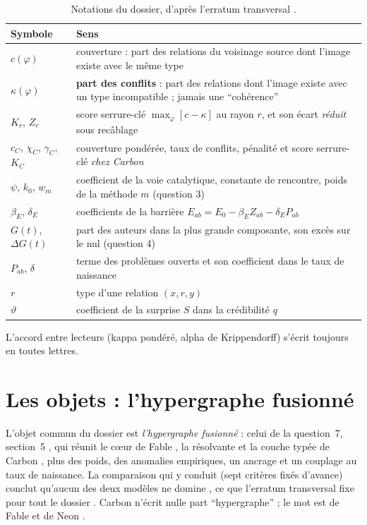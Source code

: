 \documentclass[11pt,a4paper]{article}
\theoremstyle{definition}
\theoremstyle{plain}
\begin{document}
\begin{table}[ht]
\centering\small
\caption{Notations du dossier, d'après l'erratum transversal \cite{erratumkappa}.}
\label{tab:notations}
\begin{tabularx}{\textwidth}{@{}lX@{}}
\toprule
Symbole & Sens \\
\midrule
$c(\varphi)$ & couverture : part des relations du voisinage source dont l'image existe avec le même type \\
$\kappa(\varphi)$ & \textbf{part des conflits} : part des relations dont l'image existe avec un type incompatible ; jamais une \enquote{cohérence} \\
$K_r$, $Z_r$ & score serrure-clé $\max_\varphi[c-\kappa]$ au rayon $r$, et son écart \emph{réduit} sous recâblage \\
$c_C$, $\chi_C$, $\gamma_C$, $K_C$ & couverture pondérée, taux de conflits, pénalité et score serrure-clé \emph{chez Carbon} \\
$\psi$, $k_0$, $w_m$ & coefficient de la voie catalytique, constante de rencontre, poids de la méthode $m$ (question 3) \\
$\beta_E$, $\delta_E$ & coefficients de la barrière $E_{ab}=E_0-\beta_E Z_{ab}-\delta_E P_{ab}$ \\
$G(t)$, $\Delta G(t)$ & part des auteurs dans la plus grande composante, son excès sur le nul (question 4) \\
$P_{ab}$, $\delta$ & terme des problèmes ouverts et son coefficient dans le taux de naissance \\
$r$ & type d'une relation $(x,r,y)$ \\
$\vartheta$ & coefficient de la surprise $S$ dans la crédibilité $q$ \\
\bottomrule
\end{tabularx}
\end{table}
L'accord entre lecteurs (kappa pondéré, alpha de Krippendorff) s'écrit toujours en toutes lettres.

\section{Les objets : l'hypergraphe fusionné}
\label{sec:objets}

L'objet commun du dossier est \emph{l'hypergraphe fusionné} : celui de la question~7, section~5
\cite{q7}, qui réunit le cœur de Fable \cite{fable}, la résolvante et la couche typée de
Carbon \cite{carbonmeta,carbonhomo}, plus des poids, des anomalies empiriques, un ancrage et un
couplage au taux de naissance. La comparaison qui y conduit (sept critères fixés d'avance) conclut
qu'aucun des deux modèles ne domine \cite[section~4]{q7}, ce que l'erratum transversal fixe
pour tout le dossier \cite[section~2]{erratumkappa}. Carbon n'écrit nulle part
\enquote{hypergraphe} ; le mot est de Fable et de Neon \cite[section~2]{q7}.
\end{document}
